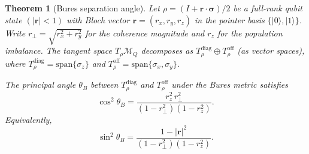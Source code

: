 \documentclass[12pt,a4paper]{article}
\newtheorem{theorem}{Theorem}[section]
\theoremstyle{definition}
\theoremstyle{remark}
\begin{document}
\begin{theorem}[Bures separation angle]
\label{thm:bures-angle}
Let $\rho = (I + \mathbf{r} \cdot \boldsymbol{\sigma})/2$ be a full-rank qubit state $(|\mathbf{r}| < 1)$ with Bloch vector $\mathbf{r} = (r_x, r_y, r_z)$ in the pointer basis $\{|0\rangle, |1\rangle\}$.  Write $r_\perp = \sqrt{r_x^2 + r_y^2}$ for the coherence magnitude and $r_z$ for the population imbalance.  The tangent space $T_\rho \mathcal{M}_Q$ decomposes as $T_\rho^{\mathrm{diag}} \oplus T_\rho^{\mathrm{off}}$ (as vector spaces), where $T_\rho^{\mathrm{diag}} = \mathrm{span}\{\sigma_z\}$ and $T_\rho^{\mathrm{off}} = \mathrm{span}\{\sigma_x, \sigma_y\}$.

The principal angle $\theta_B$ between $T_\rho^{\mathrm{diag}}$ and $T_\rho^{\mathrm{off}}$ under the Bures metric satisfies
\begin{equation}
\label{eq:bures-angle}
\cos^2 \theta_B = \frac{r_z^2\, r_\perp^2}{(1 - r_\perp^2)(1 - r_z^2)}.
\end{equation}
Equivalently,
\begin{equation}
\label{eq:bures-angle-sin}
\sin^2 \theta_B = \frac{1 - |\mathbf{r}|^2}{(1 - r_\perp^2)(1 - r_z^2)}.
\end{equation}
\end{theorem}
\end{document}
